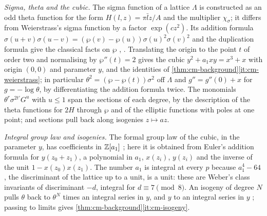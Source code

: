 \emph{Sigma, theta and the cubic.} The sigma function of a lattice $\Lambda$ is constructed as an odd
theta function for the form $H(l,z)=\pi\bar lz/A$ and the multiplier $\chi_\sigma$; it differs from
Weierstrass's sigma function by a factor $\exp(cz^2)$. Its addition formula
$\sigma(u+v)\sigma(u-v)=(\wp(v)-\wp(u))\sigma(u)^2\sigma(v)^2$ and the duplication formula give the classical
facts on $\wp$ \cite[VI]{Silverman2009}, \cite[I]{Silverman1994}. Translating the origin to the point $t$
of order two and normalising by $\wp''(t)=2$ gives the cubic $y^2+a_1xy=x^3+x$ with origin $(0,0)$ and
parameter $y$, and the identities of \cref{thm:cm-background}\ref{it:cm-weierstrass}; in particular
$\theta^2=(\wp-\wp(t))\sigma^2$ off $\Lambda$ and $g''=g''(0)+x$ for $g=-\log\theta$, by differentiating the
addition formula twice. The monomials $\theta^r\sigma^{2t'}G^u$ with $u\le1$ span the sections of each
degree, by the description of the theta functions for $2H$ through $\wp$ and of the elliptic functions
with poles at one point; and sections pull back along isogenies $z\mapsto az$.

\emph{Integral group law and isogenies.} The formal group law of the cubic, in the parameter $y$, has
coefficients in $\mathbb{Z}[a_1]$ \cite[IV.1--IV.2]{Silverman2009}; here it is obtained from Euler's addition
formula for $y(z_0+z_1)$, a polynomial in $a_1$, $x(z_i)$, $y(z_i)$ and the inverse of the unit
$1-x(z_0)x(z_1)$. The number $a_1$ is integral at every $p$ because $a_1^4-64$, the discriminant of the
lattice up to a unit, is a unit: these are Weber's class invariants of discriminant $-d$, integral for
$d\equiv7\pmod8$. An isogeny of degree $N$ pulls $\theta$ back to $\theta^N$ times an integral series in $y$,
and $y$ to an integral series in $y$ \cite[VII]{Silverman2009}; passing to limits gives
\cref{thm:cm-background}\ref{it:cm-isogeny}.

